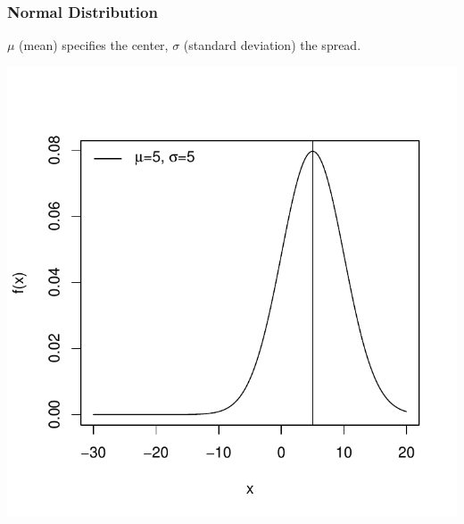 \documentclass[handout]{beamer}
\begin{document}
\begin{frame}
\frametitle{Normal Distribution}
$\mu$ (mean) specifies the center, $\sigma$ (standard deviation) the spread.
\begin{center}
\includegraphics{figure/lec02-003}
\end{center}
\end{frame}
\end{document}
